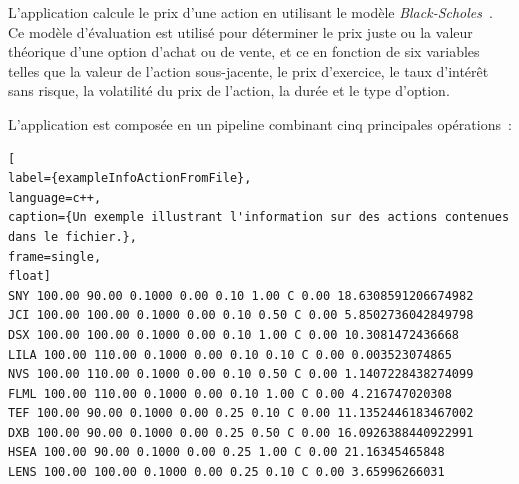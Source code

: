 L'application  calcule le prix d'une action en utilisant le modèle \emph{Black-Scholes}~\citep{macbeth1979empirical}. Ce mod\`ele d'\'evaluation est utilis\'e pour d\'eterminer le prix juste ou la valeur th\'eorique d'une option d'achat ou de vente, et ce en fonction de six variables telles que la valeur de l'action sous-jacente, le prix d'exercice, le taux d'int\'er\^et sans risque, la volatilit\'e du prix de l'action, la dur\'ee et le type d'option. 

L'application  est compos\'ee en un pipeline combinant cinq principales op\'erations~: 

\begin{lstlisting}[
label={exampleInfoActionFromFile},
language=c++,
caption={Un exemple illustrant l'information sur des actions contenues dans le fichier.},
frame=single,
float]
SNY 100.00 90.00 0.1000 0.00 0.10 1.00 C 0.00 18.6308591206674982
JCI 100.00 100.00 0.1000 0.00 0.10 0.50 C 0.00 5.8502736042849798
DSX 100.00 100.00 0.1000 0.00 0.10 1.00 C 0.00 10.3081472436668
LILA 100.00 110.00 0.1000 0.00 0.10 0.10 C 0.00 0.003523074865
NVS 100.00 110.00 0.1000 0.00 0.10 0.50 C 0.00 1.1407228438274099
FLML 100.00 110.00 0.1000 0.00 0.10 1.00 C 0.00 4.216747020308
TEF 100.00 90.00 0.1000 0.00 0.25 0.10 C 0.00 11.1352446183467002
DXB 100.00 90.00 0.1000 0.00 0.25 0.50 C 0.00 16.0926388440922991
HSEA 100.00 90.00 0.1000 0.00 0.25 1.00 C 0.00 21.16345465848
LENS 100.00 100.00 0.1000 0.00 0.25 0.10 C 0.00 3.65996266031
\end{lstlisting}

